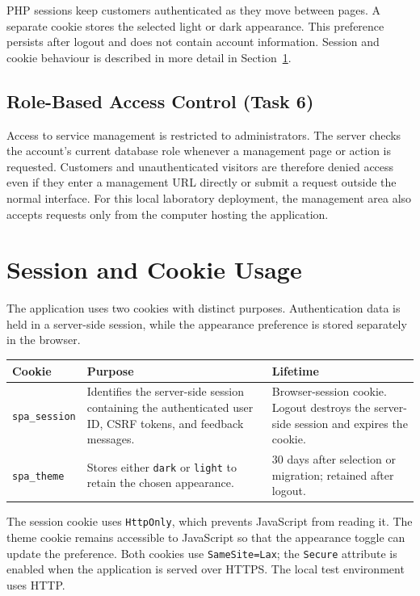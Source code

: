 \documentclass[11pt,a4paper]{article}
\newcommand{\code}[1]{{\small\nolinkurl{#1}}}
\begin{document}
PHP sessions keep customers authenticated as they move between pages.
A separate cookie stores the selected light or dark appearance. This preference
persists after logout and does not contain account information. Session and
cookie behaviour is described in more detail in Section~\ref{sec:sessions}.

\subsection{Role-Based Access Control (Task 6)}

Access to service management is restricted to administrators. The server checks
the account's current database role whenever a management page or action is
requested. Customers and unauthenticated visitors are therefore denied access
even if they enter a management URL directly or submit a request outside the
normal interface. For this local laboratory deployment, the management area
also accepts requests only from the computer hosting the application.

\clearpage
\section{Session and Cookie Usage}
\label{sec:sessions}

The application uses two cookies with distinct purposes. Authentication data
is held in a server-side session, while the appearance preference is stored
separately in the browser.

\begin{tabularx}{\linewidth}{@{}P{27mm}YY@{}}
\toprule
\textbf{Cookie} & \textbf{Purpose} & \textbf{Lifetime} \\
\midrule
\code{spa_session} & Identifies the server-side session containing the
authenticated user ID, CSRF tokens, and feedback messages.
& Browser-session cookie. Logout destroys the server-side session and expires
the cookie. \\
\code{spa_theme} & Stores either \code{dark} or \code{light} to retain the
chosen appearance.
& 30 days after selection or migration; retained after logout. \\
\bottomrule
\end{tabularx}

The session cookie uses \code{HttpOnly}, which prevents JavaScript from reading
it. The theme cookie remains accessible to JavaScript so that the appearance
toggle can update the preference. Both cookies use \code{SameSite=Lax}; the
\code{Secure} attribute is enabled when the application is served over HTTPS.
The local test environment uses HTTP.
\end{document}
